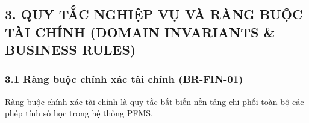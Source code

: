 \documentclass[11pt,a4paper]{article}
\begin{document}
\clearpage
\subsection{3. QUY TẮC NGHIỆP VỤ VÀ RÀNG BUỘC TÀI CHÍNH (DOMAIN
INVARIANTS \& BUSINESS
RULES)}\label{3-quy-tux1eafc-nghiux1ec7p-vux1ee5-vuxe0-ruxe0ng-buux1ed9c-tuxe0i-chuxednh-domain-invariants--business-rules}

\subsubsection{3.1 Ràng buộc chính xác tài chính
(BR-FIN-01)}\label{31-ruxe0ng-buux1ed9c-chuxednh-xuxe1c-tuxe0i-chuxednh-br-fin-01}

Ràng buộc chính xác tài chính là quy tắc bất biến nền tảng chi phối toàn
bộ các phép tính số học trong hệ thống PFMS.
\end{document}
